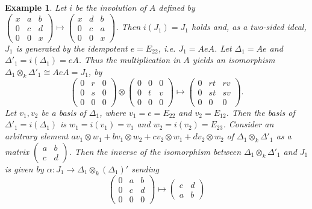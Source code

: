 \documentclass[oneside, a4paper, 11pt]{amsart}
\newtheorem{example}[theorem]{Example}
\begin{document}
\begin{example}
Let $i$ be the involution of $A$ defined by $\left(\begin{array}{ccc} x & a & b\\ 0 & c & d \\ 0 & 0 & x\end{array}\right) \mapsto \left(\begin{array}{ccc} x & d & b\\ 0 & c & a \\ 0 & 0 & x\end{array}\right)$. Then $i(J_1)=J_1$ holds and, as a two-sided ideal, $J_1$ is generated by the idempotent $e=E_{22}$, i.e. $J_1=A e A$. Let $\Delta_1 = A e$ and ${\Delta'}_1 = i(\Delta_1) = e A$. Thus the multiplication in $A$ yields an isomorphism $\Delta_1 \otimes_k {\Delta'}_1 \cong A e A = J_1$, by 
$$\left(\begin{array}{ccc} 0 & r & 0\\ 0 & s & 0 \\ 0 & 0 & 0\end{array}\right) \otimes \left(\begin{array}{ccc} 0 & 0 & 0\\ 0 & t & v \\ 0 & 0 & 0\end{array}\right) \mapsto  
\left(\begin{array}{ccc} 0 & rt & rv\\ 0 & st & sv \\ 0 & 0 & 0\end{array}\right).
$$
 Let $v_1, v_2$ be a basis of $\Delta_1$, where $v_1=e=E_{22}$  and $v_2 = E_{12}$. Then the basis of ${\Delta'}_1 = i(\Delta_1)$ is $w_1=i(v_1)=v_1$ and $w_2=i(v_2)=E_{23}$. Consider an arbitrary element $av_1\otimes w_1 + b v_1\otimes w_2 + cv_2\otimes w_1 + dv_2\otimes w_2$ of $\Delta_1 \otimes_k {\Delta'}_1$ as a matrix $\left( \begin{array}{cc}
a & b \\ c & d \end{array}\right)$. Then the inverse of the isomorphism between  $\Delta_1 \otimes_k {\Delta'}_1$ and $J_1$ is given by
$\alpha:J_1 \to \Delta_1 \otimes_k (\Delta_1)'$ sending
$$
\left( \begin{array}{ccc}
0 & a & b \\ 0 & c & d \\ 0 & 0 & 0
\end{array}\right)
\mapsto \left( \begin{array}{cc}
c & d \\ a & b 
\end{array}\right) $$

\end{example}
\end{document}

